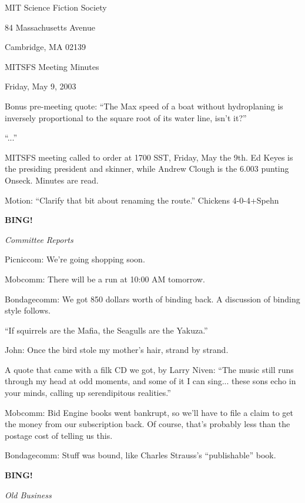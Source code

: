 \documentclass[12pt]{article}
\newcommand{\bing}{{\bf BING!} }
\newcommand{\goto}[1]{\bing \vskip 12pt \centerline{{\em{#1}}}}
\begin{document}
\begin{center}

MIT Science Fiction Society 

84 Massachusetts Avenue

Cambridge, MA 02139

\vspace{12pt}

MITSFS Meeting Minutes 

Friday, May 9, 2003

\end{center}
 
\vspace{18pt}

\setlength{\parskip}{6pt}

\noindent

Bonus pre-meeting quote:  ``The Max speed of a boat without hydroplaning is inversely proportional to the square root of its water line, isn't it?''

``...''

MITSFS meeting called to order at 1700 SST, Friday, May the 9th.  Ed Keyes is the presiding president and skinner, while Andrew Clough is the 6.003 punting Onseck.  Minutes are read.

Motion:  ``Clarify that bit about renaming the route.''  Chickens 4-0-4+Spehn


\goto{Committee Reports}

Picniccom:  We're going shopping soon.

Mobcomm: There will be a run at 10:00 AM tomorrow.

Bondagecomm:  We got 850 dollars worth of binding back.  A discussion of binding style follows.

``If squirrels are the Mafia, the Seagulls are the Yakuza.''

John:  Once the bird stole my mother's hair, strand by strand.

A quote that came with a filk CD we got, by Larry Niven:  ``The music still runs through my head at odd moments, and some of it I can sing... these sons echo in your minds, calling up serendipitous realities.''

Mobcomm:  Bid Engine books went bankrupt, so we'll have to file a claim to get the money from our subscription back.  Of course, that's probably less than the postage cost of telling us this.

Bondagecomm:  Stuff was bound, like Charles Strauss's ``publishable'' book.

\goto{Old Business}
\end{document}

